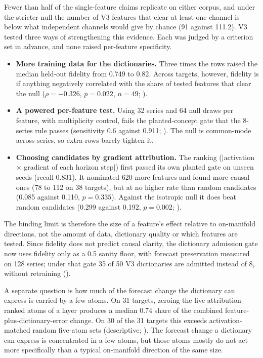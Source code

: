 Fewer than half of the single-feature claims replicate on either corpus, and under the stricter null the number of V3
features that clear at least one channel is below what independent channels would give by chance (91 against 111.2).
V3 tested three ways of strengthening this evidence. Each was judged by a criterion set in advance, and none raised
per-feature specificity.
\begin{itemize}
  \item \textbf{More training data for the dictionaries.} Three times the rows raised the median held-out fidelity from
    0.749 to 0.82. Across targets, however, fidelity is if anything negatively correlated with the share of tested
    features that clear the null ($\rho=-0.326$, $p=0.022$, $n=49$; ).
  \item \textbf{A powered per-feature test.} Using 32 series and 64 null draws per feature, with multiplicity control,
    fails the planted-concept gate that the 8-series rule passes (sensitivity 0.6 against 0.911; ). The null
    is common-mode across series, so extra rows barely tighten it.
  \item \textbf{Choosing candidates by gradient attribution.} The ranking ($|$activation $\times$ gradient of each horizon
    step$|$) first passed its own planted gate on unseen seeds (recall 0.831). It nominated 620 more features and found
    more causal ones (78 to 112 on 38 targets), but at no higher rate than random candidates (0.085 against 0.110,
    $p=0.335$). Against the isotropic null it does beat random candidates (0.299 against 0.192, $p=0.002$; ).
\end{itemize}
The binding limit is therefore the size of a feature's effect relative to on-manifold directions, not the amount of
data, dictionary quality or which features are tested. Since fidelity does not predict causal clarity, the dictionary
admission gate now uses fidelity only as a 0.5 sanity floor, with forecast preservation measured on 128 series; under
that gate 35 of 50 V3 dictionaries are admitted instead of 8, without retraining ().

A separate question is how much of the forecast change the
dictionary can express is carried by a few atoms. On 31 targets, zeroing the five attribution-ranked atoms of a layer
produces a median 0.74 share of the combined feature-plus-dictionary-error change. On 30 of the 31 targets this exceeds
activation-matched random five-atom sets (descriptive; ). The forecast change a dictionary can express is
concentrated in a few atoms, but those atoms mostly do not act more specifically than a typical on-manifold direction of
the same size.

